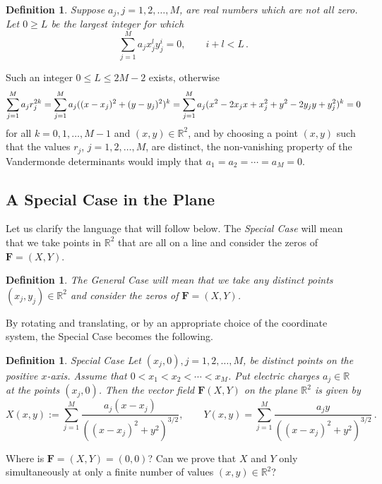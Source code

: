 \documentclass{article}
\newtheorem{defn}[thm]{\bf Definition}
\theoremstyle{remark}
\numberwithin{equation}{section}
\begin{document}
\begin{defn}\label{LGen} Suppose $a_j, j=1,2,\ldots,M$, are real numbers which are not all zero. Let $0 \geq L$ be the largest integer for which
$$\sum_{j=1}^M{a_jx_j^ly_j^i} = 0, \qquad i+l < L\,.$$
\end{defn}

\noindent Such an integer $0 \leq L \leq 2M-2$ exists, otherwise
\begin{equation} \notag \sum_{j=1}^M{a_jr_j^{2k}} = \sum_{j=1}^M{a_j((x-x_j)^2 + (y-y_j)^2)^k} = \sum_{j=1}^M{a_j(x^2 - 2x_jx + x_j^2 + y^2 - 2y_jy + y_j^2)^k} = 0
\end{equation}
for all $k=0,1,\ldots,M-1$ and $(x,y) \in {\mathbb R}^2$, and by choosing a point $(x,y)$ such that the values $r_j$, $j=1,2,\ldots,M$, are distinct,
the non-vanishing property of the Vandermonde determinants would imply that $a_1=a_2=\cdots=a_M=0$. 


\subsection{A Special Case in the Plane}\label{Special}

Let us clarify the language that will follow below.  The {\em Special Case} will mean that we take points in ${\mathbb R}^2$ that are all on a line and consider the zeros of ${\mathbf F}=(X,Y)$.  

\begin{defn}\label{GC}
The {\em General Case} will mean that we take any distinct points $(x_j,y_j) \in {\mathbb R}^2$ and consider the zeros of ${\mathbf F}=(X,Y)$. 
\end{defn}

By rotating and translating, or by an appropriate choice of the coordinate system, the Special Case becomes the following.  

\begin{defn}\label{SC}{Special Case} Let $(x_j,0), j = 1,2,\ldots,M$, be distinct points on the positive $x$-axis. Assume that $0 < x_1 < x_2 < \cdots < x_M$. 
Put electric charges $a_j \in {\mathbb R}$ at the points $(x_j,0)$. Then the vector field ${\mathbf F}(X,Y)$ on the plane ${\mathbb R}^2$ is given by 
$$X(x,y) := \sum_{j=1}^M{\frac{a_j(x-x_j)}{\left( (x-x_j)^2 + y^2 \right)^{3/2}}}, \qquad  Y(x,y) = \sum_{j=1}^M{\frac{a_jy}{\left( (x-x_j)^2 + y^2 \right)^{3/2}}}\,.$$  
\end{defn}

Where is ${\mathbf F}=(X,Y)=(0,0)$? 
Can we prove that $X$ and $Y$ only simultaneously at only a finite number of values $(x,y) \in {\mathbb R}^2$?
\end{document}
